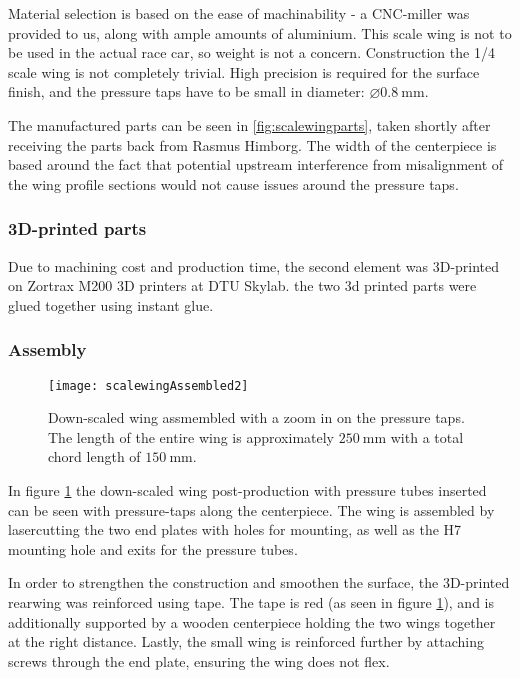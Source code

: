      Material selection is based on the ease of machinability - a CNC-miller was provided to us, along with ample amounts of aluminium. This scale wing is not to be used in the actual race car, so weight is not a concern. Construction the 1/4 scale wing is not completely trivial. High precision is required for the surface finish, and the pressure taps have to be small in diameter: $\diameter\SI{0.8}{\milli\metre}$.

      The manufactured parts can be seen in \ref{fig:scalewingparts}, taken shortly after receiving the parts back from Rasmus Himborg. The width of the centerpiece is based around the fact that potential upstream interference from misalignment of the wing profile sections would not cause issues around the pressure taps.

      \subsubsection{3D-printed parts}

        Due to machining cost and production time, the second element was 3D-printed on Zortrax M200 3D printers at DTU Skylab. the two 3d printed parts were glued together using instant glue.

      \subsubsection{Assembly}

      \begin{figure}
        \texttt{[image: scalewingAssembled2]}
        \caption{Down-scaled wing assmembled with a zoom in on the pressure taps. The length of the entire wing is approximately $\SI{250}{\milli\metre}$ with a total chord length of $\SI{150}{\milli\metre}$.}
        \label{fig:scalewing}
      \end{figure}

      In figure \ref{fig:scalewing} the down-scaled wing post-production with pressure tubes inserted can be seen with pressure-taps along the centerpiece. The wing is assembled by lasercutting the two end plates with holes for mounting, as well as the H7 mounting hole and exits for the pressure tubes.

      In order to strengthen the construction and smoothen the surface, the 3D-printed rearwing was reinforced using tape. The tape is red (as seen in figure \ref{fig:scalewing}), and is additionally supported by a wooden centerpiece holding the two wings together at the right distance. Lastly, the small wing is reinforced further by attaching screws through the end plate, ensuring the wing does not flex.

